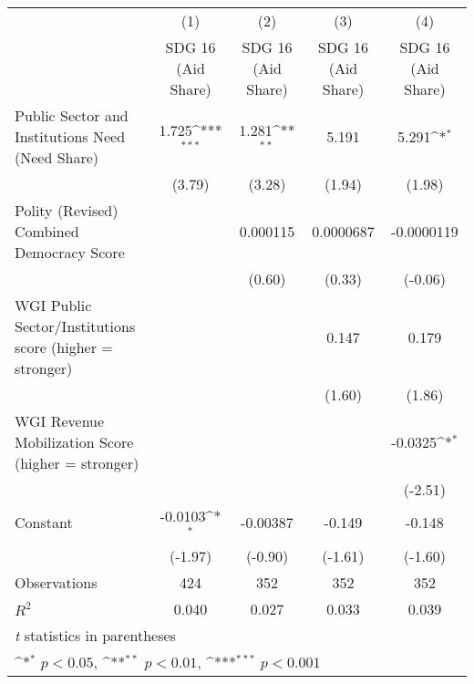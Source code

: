 {
\def\sym#1{\ifmmode^{#1}\else\(^{#1}\)\fi}
\begin{tabular}{l*{4}{c}}
\hline\hline
                &\multicolumn{1}{c}{(1)}&\multicolumn{1}{c}{(2)}&\multicolumn{1}{c}{(3)}&\multicolumn{1}{c}{(4)}\\
                &\multicolumn{1}{c}{SDG 16 (Aid Share)}&\multicolumn{1}{c}{SDG 16 (Aid Share)}&\multicolumn{1}{c}{SDG 16 (Aid Share)}&\multicolumn{1}{c}{SDG 16 (Aid Share)}\\
\hline
Public Sector and Institutions Need (Need Share)&    1.725\sym{***}&    1.281\sym{**} &    5.191         &    5.291\sym{*}  \\
                &   (3.79)         &   (3.28)         &   (1.94)         &   (1.98)         \\
[1em]
Polity (Revised) Combined Democracy Score&                  & 0.000115         &0.0000687         &-0.0000119         \\
                &                  &   (0.60)         &   (0.33)         &  (-0.06)         \\
[1em]
WGI Public Sector/Institutions score (higher = stronger)&                  &                  &    0.147         &    0.179         \\
                &                  &                  &   (1.60)         &   (1.86)         \\
[1em]
WGI Revenue Mobilization Score (higher = stronger)&                  &                  &                  &  -0.0325\sym{*}  \\
                &                  &                  &                  &  (-2.51)         \\
[1em]
Constant        &  -0.0103\sym{*}  & -0.00387         &   -0.149         &   -0.148         \\
                &  (-1.97)         &  (-0.90)         &  (-1.61)         &  (-1.60)         \\
\hline
Observations    &      424         &      352         &      352         &      352         \\
\(R^{2}\)       &    0.040         &    0.027         &    0.033         &    0.039         \\
\hline\hline
\multicolumn{5}{l}{\footnotesize \textit{t} statistics in parentheses}\\
\multicolumn{5}{l}{\footnotesize \sym{*} \(p<0.05\), \sym{**} \(p<0.01\), \sym{***} \(p<0.001\)}\\
\end{tabular}
}
